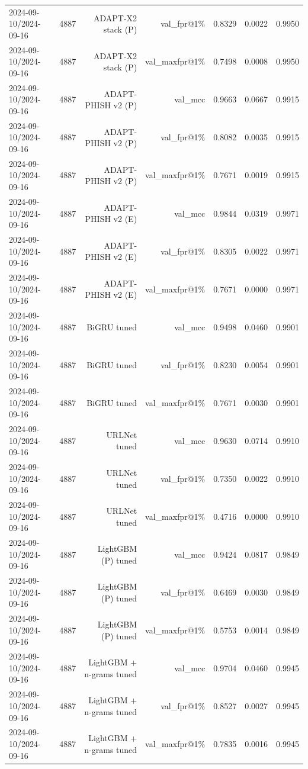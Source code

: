 \begin{table}[t]
\begin{tabular}{llrrrrr}
2024-09-10/2024-09-16 & 4887 & ADAPT-X2 stack (P) & val\_fpr@1\% & 0.8329 & 0.0022 & 0.9950 \\
2024-09-10/2024-09-16 & 4887 & ADAPT-X2 stack (P) & val\_maxfpr@1\% & 0.7498 & 0.0008 & 0.9950 \\
2024-09-10/2024-09-16 & 4887 & ADAPT-PHISH v2 (P) & val\_mcc & 0.9663 & 0.0667 & 0.9915 \\
2024-09-10/2024-09-16 & 4887 & ADAPT-PHISH v2 (P) & val\_fpr@1\% & 0.8082 & 0.0035 & 0.9915 \\
2024-09-10/2024-09-16 & 4887 & ADAPT-PHISH v2 (P) & val\_maxfpr@1\% & 0.7671 & 0.0019 & 0.9915 \\
2024-09-10/2024-09-16 & 4887 & ADAPT-PHISH v2 (E) & val\_mcc & 0.9844 & 0.0319 & 0.9971 \\
2024-09-10/2024-09-16 & 4887 & ADAPT-PHISH v2 (E) & val\_fpr@1\% & 0.8305 & 0.0022 & 0.9971 \\
2024-09-10/2024-09-16 & 4887 & ADAPT-PHISH v2 (E) & val\_maxfpr@1\% & 0.7671 & 0.0000 & 0.9971 \\
2024-09-10/2024-09-16 & 4887 & BiGRU tuned & val\_mcc & 0.9498 & 0.0460 & 0.9901 \\
2024-09-10/2024-09-16 & 4887 & BiGRU tuned & val\_fpr@1\% & 0.8230 & 0.0054 & 0.9901 \\
2024-09-10/2024-09-16 & 4887 & BiGRU tuned & val\_maxfpr@1\% & 0.7671 & 0.0030 & 0.9901 \\
2024-09-10/2024-09-16 & 4887 & URLNet tuned & val\_mcc & 0.9630 & 0.0714 & 0.9910 \\
2024-09-10/2024-09-16 & 4887 & URLNet tuned & val\_fpr@1\% & 0.7350 & 0.0022 & 0.9910 \\
2024-09-10/2024-09-16 & 4887 & URLNet tuned & val\_maxfpr@1\% & 0.4716 & 0.0000 & 0.9910 \\
2024-09-10/2024-09-16 & 4887 & LightGBM (P) tuned & val\_mcc & 0.9424 & 0.0817 & 0.9849 \\
2024-09-10/2024-09-16 & 4887 & LightGBM (P) tuned & val\_fpr@1\% & 0.6469 & 0.0030 & 0.9849 \\
2024-09-10/2024-09-16 & 4887 & LightGBM (P) tuned & val\_maxfpr@1\% & 0.5753 & 0.0014 & 0.9849 \\
2024-09-10/2024-09-16 & 4887 & LightGBM + n-grams tuned & val\_mcc & 0.9704 & 0.0460 & 0.9945 \\
2024-09-10/2024-09-16 & 4887 & LightGBM + n-grams tuned & val\_fpr@1\% & 0.8527 & 0.0027 & 0.9945 \\
2024-09-10/2024-09-16 & 4887 & LightGBM + n-grams tuned & val\_maxfpr@1\% & 0.7835 & 0.0016 & 0.9945 \\

\end{tabular}
\end{table}
